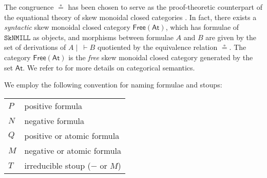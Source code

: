 \documentclass[runningheads]{llncs}
\newcommand{\lf}{\dn_\mathsf{lf}}%
\newcommand{\SkNMILL}{\texttt{SkNMILL}}
\newcommand{\FSkMCC}{\mathsf{Free}}
\newcommand{\up}{\Uparrow}
\newcommand{\dn}{\Downarrow}
\newcommand{\At}{\mathsf{At}}
\begin{document}
The congruence $\circeq$ has been chosen to serve as the proof-theoretic counterpart of the equational theory of skew monoidal closed categories \cite{street:skew-closed:2013}.
In fact, there exists a \emph{syntactic} skew monoidal closed category $\FSkMCC(\At)$, which has formulae of $\SkNMILL$ as objects, and morphisms between formulae $A$ and $B$ are given by the set of derivations of $A \mid ~ \vdash B$ quotiented by the equivalence relation $\circeq$. The category $\FSkMCC(\At)$ is the \emph{free} skew monoidal closed category generated by the set $\At$. We refer to \cite{UVW:protsn} for more details on categorical semantics.

We employ the following convention for naming formulae and stoups:
\begin{center}
  \begin{tabular}{|@{\;}l@{\qquad}l@{\;}|}
    \hline
  $P$ & positive formula \\
  $N$ & negative formula\\
  $Q$ & positive or atomic formula \\
  $M$ & negative or atomic formula \\
    $T$ & irreducible stoup ($-$ or $M$)\\ \hline
\end{tabular}
    \end{center}

\end{document}
